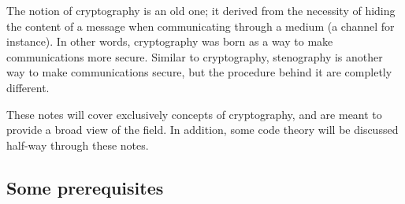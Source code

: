 \documentclass{subfiles}
\begin{document}
    The notion of cryptography is an old one;
        it derived from the necessity of hiding the content of a message when communicating
        through a medium (a channel for instance). In other words,
        cryptography was born as a way to make communications more secure.
        Similar to cryptography, stenography is another way to make communications secure,
        but the procedure behind it are completly different.

    These notes will cover exclusively concepts of cryptography,
        and are meant to provide a broad view of the field.
        In addition, some code theory will be discussed half-way through these notes.

    \subsection{Some prerequisites}
    
\end{document}
